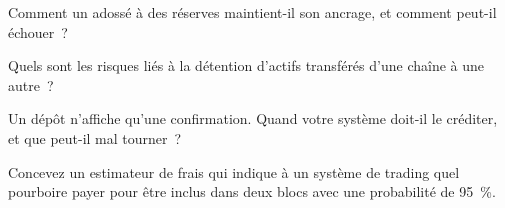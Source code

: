 \begin{interviewq}\label{iq:m3:blockchains-for-traders:3}
Comment un  adossé à des réserves maintient-il son ancrage, et comment peut-il échouer~?
\end{interviewq}

\begin{interviewq}\label{iq:m3:blockchains-for-traders:4}
Quels sont les risques liés à la détention d'actifs transférés d'une chaîne à une autre~?
\end{interviewq}

\begin{interviewq}\label{iq:m3:blockchains-for-traders:5}
Un dépôt n'affiche qu'une confirmation. Quand votre système doit-il le créditer, et que peut-il mal tourner~?
\end{interviewq}

\begin{interviewq}\label{iq:m3:blockchains-for-traders:6}
Concevez un estimateur de frais qui indique à un système de trading quel pourboire payer pour être inclus dans deux blocs avec
une probabilité de 95~\%.
\end{interviewq}
